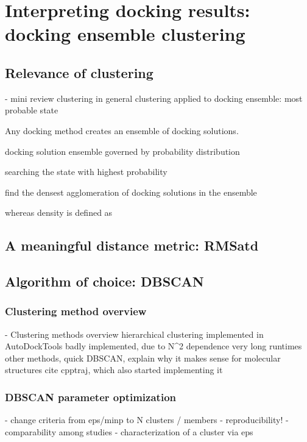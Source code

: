 \chapter{Interpreting docking results: docking ensemble clustering}
\section{Relevance of clustering}


    -  mini review
        clustering in general
        clustering applied to docking ensemble: most probable state


Any docking method creates an ensemble of docking solutions.

docking solution ensemble governed by probability distribution

searching the state with highest probability

find the densest agglomeration of docking solutions in the ensemble

whereas density is defined as


\section{A meaningful distance metric: RMSatd}

\section{Algorithm of choice: DBSCAN}

\subsection{Clustering method overview}

    - Clustering methods overview
        hierarchical clustering implemented in AutoDockTools
            badly implemented, due to N^2 dependence very long runtimes
        other methods, quick
        DBSCAN, explain why it makes sense for molecular structures
        cite cpptraj, which also started implementing it

\subsection{DBSCAN parameter optimization}

    - change criteria from eps/minp to N clusters / members
    - reproducibility!
    - comparability among studies
    - characterization of a cluster via eps


